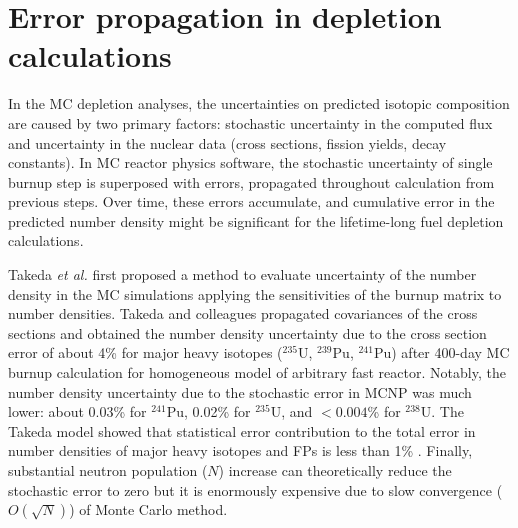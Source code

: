 \chapter{Error propagation in depletion calculations}
In the \gls{MC} depletion analyses, the uncertainties on predicted isotopic 
composition are caused by two primary factors: stochastic uncertainty in 
the computed flux and uncertainty in the nuclear data (cross sections, fission 
yields, decay constants). In \gls{MC} reactor physics software, the stochastic 
uncertainty of single burnup step is superposed with errors, propagated 
throughout calculation from previous steps. Over time, these errors 
accumulate, and cumulative error in the predicted number density might be 
significant for the lifetime-long fuel depletion calculations.

Takeda \emph{et al.} first proposed a method to evaluate uncertainty of the 
number density in the \gls{MC} simulations applying the sensitivities of the 
burnup matrix to number densities. Takeda and colleagues 
propagated covariances of the cross sections and obtained the number 
density uncertainty due to the cross section error of about 4\% for major 
heavy isotopes ($^{235}$U, $^{239}$Pu, $^{241}$Pu) after 400-day 
\gls{MC} burnup calculation for homogeneous model of arbitrary fast reactor. 
Notably, the number density uncertainty due to the stochastic error in MCNP 
was much lower: about 0.03\% for $^{241}$Pu, 0.02\% for $^{235}$U, and 
$<0.004$\% for $^{238}$U. The Takeda model showed that statistical error 
contribution to the total error in number densities of major heavy isotopes 
and \glspl{FP} is less than 1\% \cite{takeda_estimation_1999}. Finally, 
substantial neutron population ($N$) increase can theoretically reduce the 
stochastic error to zero but it is enormously expensive due to slow 
convergence ($O(\sqrt{N})$) of Monte Carlo method.

